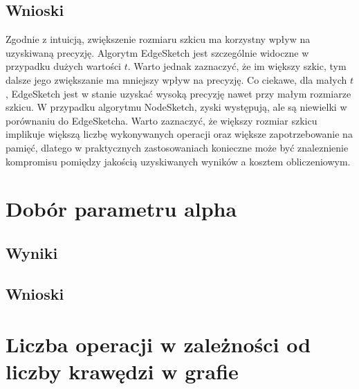    \subsection{Wnioski}
    Zgodnie z intuicją, zwiększenie rozmiaru szkicu ma korzystny wpływ na uzyskiwaną precyzję. Algorytm EdgeSketch jest szczególnie widoczne w przypadku dużych wartości $t$. Warto jednak zaznaczyć, że im większy szkic, tym dalsze jego zwiększanie ma mniejszy wpływ na precyzję. Co ciekawe, dla małych $t$, EdgeSketch jest w stanie uzyskać wysoką precyzję nawet przy małym rozmiarze szkicu.  W przypadku algorytmu NodeSketch, zyski występują, ale są niewielki w porównaniu do EdgeSketcha. Warto zaznaczyć, że większy rozmiar szkicu implikuje większą liczbę wykonywanych operacji oraz większe zapotrzebowanie na pamięć, dlatego w praktycznych zastosowaniach konieczne może być znaleznienie kompromisu pomiędzy jakością uzyskiwanych wyników a kosztem obliczeniowym.

\section{Dobór parametru alpha}

    \subsection{Wyniki}

    \subsection{Wnioski}

\section{Liczba operacji w zależności od liczby krawędzi w grafie}
\label{sec:performance}